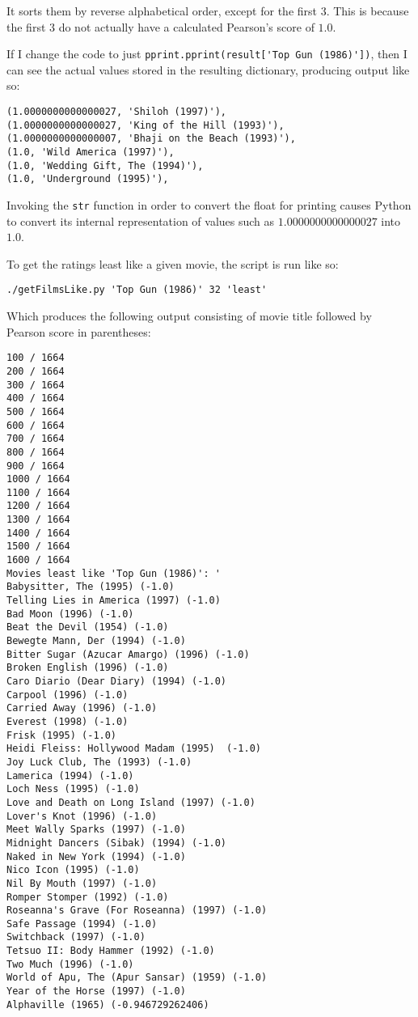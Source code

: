 \documentclass[letterpaper,11pt]{article}
\begin{document}
It sorts them by reverse alphabetical order, except for the first 3.  This is because the first 3 do not actually have a calculated Pearson's score of $1.0$.

If I change the code to just \verb+pprint.pprint(result['Top Gun (1986)'])+, then I can see the actual values stored in the resulting dictionary, producing output like so:
\begin{lstlisting}[frame=single]
(1.0000000000000027, 'Shiloh (1997)'),
(1.0000000000000027, 'King of the Hill (1993)'),
(1.0000000000000007, 'Bhaji on the Beach (1993)'),
(1.0, 'Wild America (1997)'),
(1.0, 'Wedding Gift, The (1994)'),
(1.0, 'Underground (1995)'),
\end{lstlisting}

Invoking the \verb+str+ function in order to convert the float for printing causes Python to convert its internal representation of values such as $1.0000000000000027$ into $1.0$.

To get the ratings least like a given movie, the script is run like so:
\begin{lstlisting}[frame=single]
./getFilmsLike.py 'Top Gun (1986)' 32 'least'
\end{lstlisting}

Which produces the following output consisting of movie title followed by Pearson score in parentheses:
\begin{lstlisting}[frame=single]
100 / 1664
200 / 1664
300 / 1664
400 / 1664
500 / 1664
600 / 1664
700 / 1664
800 / 1664
900 / 1664
1000 / 1664
1100 / 1664
1200 / 1664
1300 / 1664
1400 / 1664
1500 / 1664
1600 / 1664
Movies least like 'Top Gun (1986)': '
Babysitter, The (1995) (-1.0)
Telling Lies in America (1997) (-1.0)
Bad Moon (1996) (-1.0)
Beat the Devil (1954) (-1.0)
Bewegte Mann, Der (1994) (-1.0)
Bitter Sugar (Azucar Amargo) (1996) (-1.0)
Broken English (1996) (-1.0)
Caro Diario (Dear Diary) (1994) (-1.0)
Carpool (1996) (-1.0)
Carried Away (1996) (-1.0)
Everest (1998) (-1.0)
Frisk (1995) (-1.0)
Heidi Fleiss: Hollywood Madam (1995)  (-1.0)
Joy Luck Club, The (1993) (-1.0)
Lamerica (1994) (-1.0)
Loch Ness (1995) (-1.0)
Love and Death on Long Island (1997) (-1.0)
Lover's Knot (1996) (-1.0)
Meet Wally Sparks (1997) (-1.0)
Midnight Dancers (Sibak) (1994) (-1.0)
Naked in New York (1994) (-1.0)
Nico Icon (1995) (-1.0)
Nil By Mouth (1997) (-1.0)
Romper Stomper (1992) (-1.0)
Roseanna's Grave (For Roseanna) (1997) (-1.0)
Safe Passage (1994) (-1.0)
Switchback (1997) (-1.0)
Tetsuo II: Body Hammer (1992) (-1.0)
Two Much (1996) (-1.0)
World of Apu, The (Apur Sansar) (1959) (-1.0)
Year of the Horse (1997) (-1.0)
Alphaville (1965) (-0.946729262406)
\end{lstlisting}
\end{document}
